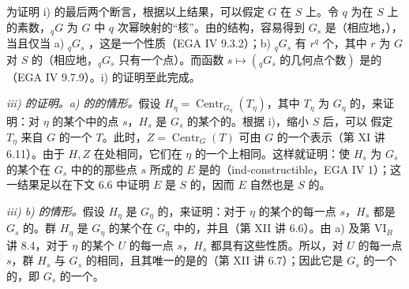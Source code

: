 为证明 i) 的最后两个断言，根据以上结果，可以假定 $G$ 在 $S$ 上。令 $q$ 为在 $S$ 上的素数，${}_qG$ 为 $G$ 中 $q$ 次幂映射的“核”。由的结构，容易得到 $G_s$ 是（相应地，），当且仅当 a) ${}_qG_s$ ，这是一个性质（EGA IV 9.3.2）；b) ${}_qG_s$ 有 $r^q$ 个，其中 $r$ 为 $G$ 对 $S$ 的（相应地，${}_qG_s$ 只有一个点）。而函数 $s\mapsto({}_qG_s\text{ 的几何点个数})$ 是的（EGA IV 9.7.9）。i) 的证明至此完成。

\emph{iii) 的证明。a) 的的情形。}假设 $H_\eta=\operatorname{Centr}_{G_\eta}(T_\eta)$，其中 $T_\eta$ 为 $G_\eta$ 的，来证明：对 $\eta$ 的某个中的点 $s$，$H_s$ 是 $G_s$ 的某个的。根据 i)，缩小 $S$ 后，可以
假定 $T_\eta$ 来自 $G$ 的一个 $T$。此时，$Z=\operatorname{Centr}_G(T)$ 可由 $G$ 的一个表示（第 XI 讲 6.11）。由于 $H,Z$ 在处相同，它们在 $\eta$ 的一个上相同。这样就证明：使 $H_s$ 为 $G_s$ 的某个在 $G_s$ 中的的那些点 $s$ 所成的 $E$ 是的（ind-constructible，EGA IV 1）；这一结果足以在下文 6.6 中证明 $E$ 是 $S$ 的，因而 $E$ 自然也是 $S$ 的。

\emph{iii) b) 的情形。}假设 $H_\eta$ 是 $G_\eta$ 的，来证明：对于 $\eta$ 的某个的每一点 $s$，$H_s$ 都是 $G_s$ 的。群 $H_\eta$ 是 $G_\eta$ 的某个在 $G_\eta$ 中的，并且（第 XII 讲 6.6）。由 a) 及第 VI$_B$ 讲 8.4，对于 $\eta$ 的某个 $U$ 的每一点 $s$，$H_s$ 都具有这些性质。所以，对 $U$ 的每一点 $s$，群 $H_s$ 与 $G_s$ 的相同，且其唯一的是的（第 XII 讲 6.7）；因此它是 $G_s$ 的一个的，即 $G_s$ 的一个。

